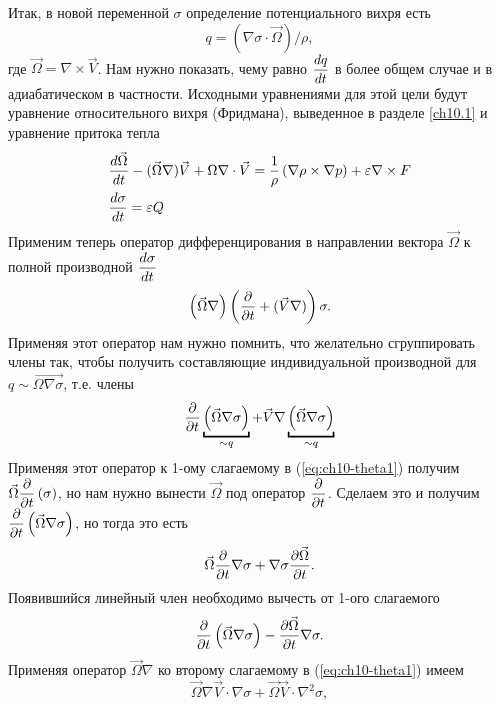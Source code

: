 Итак, в новой переменной $\sigma$ определение потенциального вихря есть 
\[
q = ( \nabla \sigma \cdot \Vec{\Omega} ) / \rho, 
\]
где $\vec{\Omega}=\nabla \times \vec{V}$. Нам нужно показать, чему равно $\displaystyle\frac{d q}{d t}$ в более общем случае и в адиабатическом в частности. Исходными уравнениями для этой цели будут уравнение относительного вихря (Фридмана), выведенное в разделе \ref{ch10.1} и уравнение притока тепла
\begin{align}
    &\displaystyle\frac{d  \vec{ \Omega} }{d t} - (\vec{\Omega}\nabla)\vec{V} + \Omega \nabla\cdot\vec{V} = \frac{1}{\rho} \left( \nabla \rho \times \nabla p \right) + \varepsilon \nabla \times F \label{eq:ch10_relvort} \\
    &\displaystyle\frac{d \sigma}{d t} = \varepsilon Q \label{eq:ch10_DsigmaDt}
\end{align}
Применим теперь оператор дифференцирования в направлении вектора $\vec{\Omega}$ к полной производной $\displaystyle\frac{d \sigma}{d t}$
\begin{equation}
\label{eq:ch10-theta1}
    \displaystyle \left(  \vec{\Omega}\nabla  \right) 
    \displaystyle \left(  \displaystyle\frac{\partial }{\partial t}+(\vec{V}\nabla)  \right) \sigma.
\end{equation}
Применяя этот оператор нам нужно помнить, что желательно сгруппировать члены так, чтобы получить составляющие индивидуальной производной для $q\sim\vec{\Omega\nabla\sigma}$, т.е. члены
\begin{equation*}
    \pd{}{t} \ub{\rb{ \vec\Omega\nabla\sigma }}_{\sim q} + \vec{V}\nabla \ub{\rb{\vec{\Omega}\nabla\sigma}}_{\sim q}
\end{equation*}
Применяя этот оператор к 1-ому слагаемому в (\ref{eq:ch10-theta1}) получим $ \vec{\Omega}\displaystyle\frac{\partial }{\partial t} \displaystyle \left( \sigma \right)$, но нам нужно вынести $\vec\Omega$ под оператор $\displaystyle\frac{\partial }{\partial t}$. Сделаем это и получим $\displaystyle\frac{\partial }{\partial t} \displaystyle \left( \vec{\Omega}\nabla\sigma \right)$, но тогда это есть 
\begin{equation*}
    \vec{\Omega}\displaystyle\frac{\partial }{\partial t}\nabla\sigma + \nabla\sigma\displaystyle\frac{\partial \vec{\Omega}}{\partial t}.
\end{equation*}
Появившийся линейный член необходимо вычесть от 1-ого слагаемого
\begin{equation}
    \label{eq:ch10-theta2}
    \displaystyle\frac{\partial }{\partial t} \displaystyle \left(  \vec{\Omega}\nabla\sigma  \right) - \displaystyle\frac{\partial \vec{\Omega}}{\partial t}\nabla\sigma.
\end{equation}
Применяя оператор $\vec{\Omega}\nabla$ ко второму слагаемому в (\ref{eq:ch10-theta1}) имеем
\begin{equation}
    \label{eq:ch10-theta3}
    \vec{\Omega}\nabla\vec{V}\cdot\nabla\sigma + \vec{\Omega}\vec{V}\cdot\nabla^2\sigma,
\end{equation}
